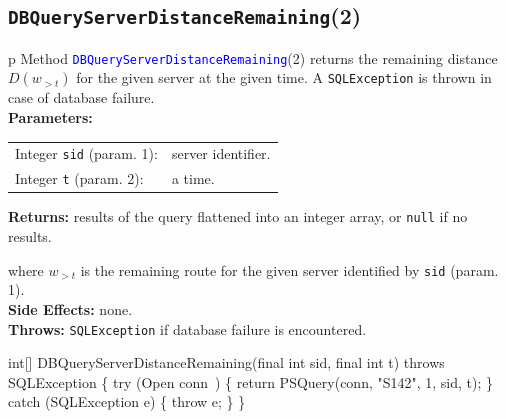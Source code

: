 \subsection{\texttt{DBQueryServerDistanceRemaining}(2)}
\begin{tabular}{p{\textwidth}}
\toprule
{}
Method \textcolor{blue}{{\tt{}\protect{}DBQueryServerDistanceRemaining}}(2) returns the
remaining distance $D(w_{>t})$ for the given server at the given time.
A {\tt{}SQLException} is thrown in case of database failure.\\
\midrule
\textbf{Parameters:} \\
\begin{tabular}{lp{116mm}}
Integer {\tt{}sid} (param. 1):&server identifier.\\
Integer {\tt{}t} (param. 2):&a time.\\
\end{tabular}
\textbf{Returns:} results of the query flattened into an integer array,
or {\tt{}null} if no results.


where $w_{>t}$ is the remaining route for the given server identified by {\tt{}sid} (param. 1).\\
\textbf{Side Effects:} none.\\
\textbf{Throws:} {\tt{}SQLException} if database failure is encountered.\\
\bottomrule
\end{tabular}
\nwenddocs{}\endmoddef{}
int[] DBQueryServerDistanceRemaining(final int sid, final int t)
throws SQLException \{
  try (\LA{}Open \code{}conn\edoc{}~{\nwtagstyle{}}\RA{}) \{
    return PSQuery(conn, "S142", 1, sid, t);
  \} catch (SQLException e) \{
    throw e;
  \}
\}
\eatline

